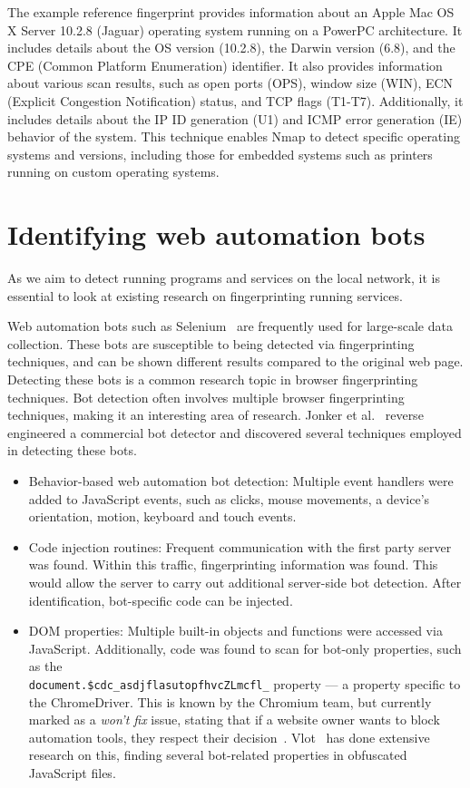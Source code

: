 The example reference fingerprint provides information about an Apple Mac OS X Server 10.2.8 (Jaguar) operating system running on a PowerPC architecture. It includes details about the OS version (10.2.8), the Darwin version (6.8), and the CPE (Common Platform Enumeration) identifier. It also provides information about various scan results, such as open ports (OPS), window size (WIN), ECN (Explicit Congestion Notification) status, and TCP flags (T1-T7). Additionally, it includes details about the IP ID generation (U1) and ICMP error generation (IE) behavior of the system. This technique enables Nmap to detect specific operating systems and versions, including those for embedded systems such as printers running on custom operating systems.

\section{Identifying web automation bots}
As we aim to detect running programs and services on the local network, it is essential to look at existing research on fingerprinting running services. 

Web automation bots such as Selenium~ are frequently used for large-scale data collection. These bots are susceptible to being detected via fingerprinting techniques, and can be shown different results compared to the original web page. Detecting these bots is a common research topic in browser fingerprinting techniques. Bot detection often involves multiple browser fingerprinting techniques, making it an interesting area of research. 
Jonker et al.~ reverse engineered a commercial bot detector and discovered several techniques employed in detecting these bots.

\begin{itemize}
    \item Behavior-based web automation bot detection: Multiple event handlers were added to JavaScript events, such as clicks, mouse movements, a device's orientation, motion, keyboard and touch events.
    \item Code injection routines: Frequent communication with the first party server was found. Within this traffic, fingerprinting information was found. This would allow the server to carry out additional server-side bot detection. After identification, bot-specific code can be injected.
    \item DOM properties: Multiple built-in objects and functions were accessed via JavaScript. Additionally, code was found to scan for bot-only properties, such as the \\\verb|document.$cdc_asdjflasutopfhvcZLmcfl_| property --- a property specific to the ChromeDriver.
    This is known by the Chromium team, but currently marked as a \emph{won't fix} issue, stating that if a website owner wants to block automation tools, they respect their decision~.
    Vlot~ has done extensive research on this, finding several bot-related properties in obfuscated JavaScript files. 
\end{itemize}

